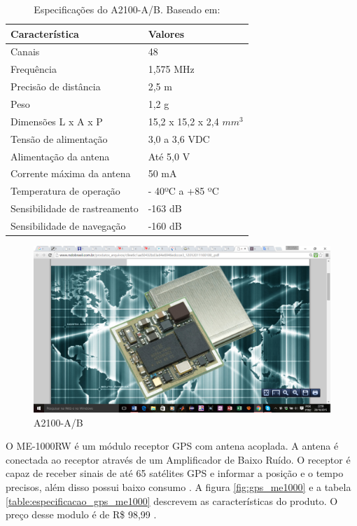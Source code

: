   \begin{table}[ht]
  \caption{Especificações do A2100-A/B. Baseado em: \cite{10gps}}
  \centering
  \begin{tabular}{| l |  p{4cm} |}
  \hline
  Característica & Valores \\
  \hline
  Canais & 48 \\
  \hline
  Frequência & 1,575 MHz \\
  \hline
  Precisão de distância & 2,5 m \\
  \hline
  Peso & 1,2 g \\
  \hline
  Dimensões L x A x P & 15,2 x 15,2 x 2,4 $ mm ^ {3} $ \\
  \hline
  Tensão de alimentação & 3,0 a 3,6 VDC \\
  \hline
  Alimentação da antena & Até 5,0 V \\
  \hline
  Corrente máxima da antena & 50 mA \\
  \hline
  Temperatura de operação & - 40ºC a +85 ºC \\
  \hline
  Sensibilidade de rastreamento & -163 dB \\
  \hline
  Sensibilidade de navegação & -160 dB \\
  \hline
  \end{tabular}
  \label{table:especificacao_gps23}
  \end{table}

  \begin{figure}[h]
    \centering
    \includegraphics[width=200 px, scale=1]{figuras/a2100}
    \caption{A2100-A/B   \cite{10gps}}
  \label{fig:a2100}
  \end{figure}


  O ME-1000RW é um módulo receptor GPS com antena acoplada. A antena é conectada
  ao receptor através de um Amplificador de Baixo Ruído. O receptor é capaz de
  receber sinais de até 65 satélites GPS e informar a posição e o tempo precisos,
  além disso possui baixo consumo \cite{11gps}. A figura \ref{fig:gps_me1000} e a tabela
  \ref{table:especificacao_gps_me1000}
  descrevem as  características do produto. O preço desse modulo é de R\$ 98,99 \cite{12gps}.


